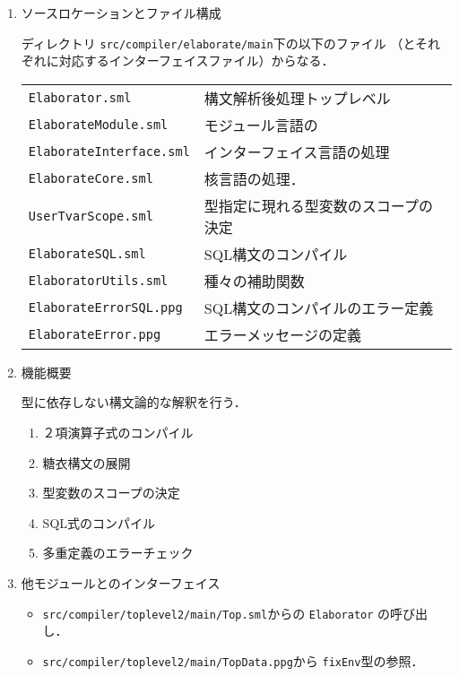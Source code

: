 \documentclass{jbook}
\newcommand{\code}[1]{\mbox{\large\tt #1}}
\begin{document}
\ifjp%
\begin{enumerate}
\item ソースロケーションとファイル構成

ディレクトリ \code{src/compiler/elaborate/main}下の以下のファイル
（とそれぞれに対応するインターフェイスファイル）からなる．

\begin{tabular}{ll}
\code{Elaborator.sml} & 構文解析後処理トップレベル\\
\code{ElaborateModule.sml} & モジュール言語の\\
\code{ElaborateInterface.sml} & インターフェイス言語の処理\\
\code{ElaborateCore.sml} & 核言語の処理．\\
\code{UserTvarScope.sml} & 型指定に現れる型変数のスコープの決定\\
\code{ElaborateSQL.sml} & SQL構文のコンパイル\\
\code{ElaboratorUtils.sml} & 種々の補助関数\\
\code{ElaborateErrorSQL.ppg} & SQL構文のコンパイルのエラー定義\\
\code{ElaborateError.ppg} & エラーメッセージの定義
\end{tabular}

\item 機能概要 

	型に依存しない構文論的な解釈を行う．
\begin{enumerate}
\item ２項演算子式のコンパイル
\item 糖衣構文の展開
\item 型変数のスコープの決定
\item SQL式のコンパイル
\item 多重定義のエラーチェック
\end{enumerate}

\item 他モジュールとのインターフェイス
\begin{itemize}
\item \code{src/compiler/toplevel2/main/Top.sml}からの
\code{Elaborator}
の呼び出し．
\item \code{src/compiler/toplevel2/main/TopData.ppg}から
\code{fixEnv}型の参照．
\end{itemize}
\end{enumerate}
\else%
\fi%
\end{document}
